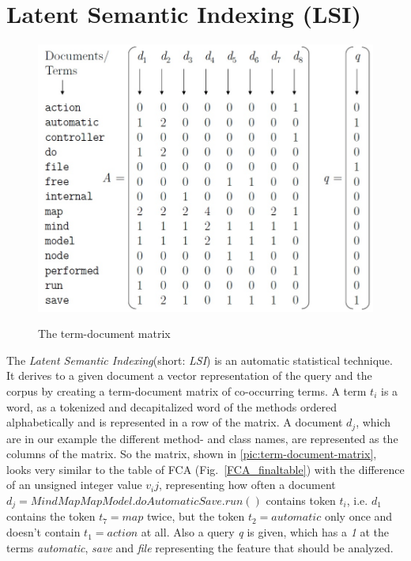 
\section{Latent Semantic Indexing (LSI)}
\label{ch:lsi}
\begin{figure}
  \centering
    \includegraphics[width=\linewidth]{src/pic/term_document_matrix}
    \label{pic:term-document-matrix}
  \caption{The term-document matrix}
\end{figure}
The \emph{Latent Semantic Indexing}(short: \emph{LSI}) is an automatic statistical technique. It derives to a given document a vector representation of the query and the corpus by creating a term-document matrix of co-occurring terms. A term $t_i$ is a word, as a tokenized and decapitalized word of the methods ordered alphabetically and is represented in a row of the matrix. A document $d_j$, which are in our example the different method- and class names, are represented as the columns of the matrix. So the matrix, shown in \autoref{pic:term-document-matrix}, looks very similar to the table of FCA (Fig.~\ref{FCA_finaltable}) with the difference of an unsigned integer value $v_ij$, representing how often a document $d_j=MindMapMapModel.doAutomaticSave.run()$ contains token $t_i$, i.e. $d_1$ contains the token $t_7=map$ twice, but the token $t_2=automatic$ only once and doesn't contain $t_1=action$ at all. Also a query \emph{q} is given, which has a \emph{1} at the terms \emph{automatic}, \emph{save} and \emph{file} representing the feature that should be analyzed. 



